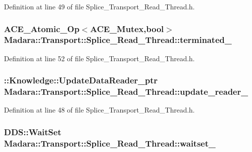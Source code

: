Definition at line 49 of file Splice\_\-Transport\_\-Read\_\-Thread.h.

\hypertarget{classMadara_1_1Transport_1_1Splice__Read__Thread_a5cafe35dd52b080cce126ee746c79033}{
\subsubsection[{terminated\_\-}]{\setlength{\rightskip}{0pt plus 5cm}ACE\_\-Atomic\_\-Op$<$ACE\_\-Mutex,bool$>$ {\bf Madara::Transport::Splice\_\-Read\_\-Thread::terminated\_\-}}}
\label{de/db7/classMadara_1_1Transport_1_1Splice__Read__Thread_a5cafe35dd52b080cce126ee746c79033}


Definition at line 52 of file Splice\_\-Transport\_\-Read\_\-Thread.h.

\hypertarget{classMadara_1_1Transport_1_1Splice__Read__Thread_a46dffcab5a39bda92f4783705bb893bd}{
\subsubsection[{update\_\-reader\_\-}]{\setlength{\rightskip}{0pt plus 5cm}::{\bf Knowledge::UpdateDataReader\_\-ptr} {\bf Madara::Transport::Splice\_\-Read\_\-Thread::update\_\-reader\_\-}}}
\label{de/db7/classMadara_1_1Transport_1_1Splice__Read__Thread_a46dffcab5a39bda92f4783705bb893bd}


Definition at line 48 of file Splice\_\-Transport\_\-Read\_\-Thread.h.

\hypertarget{classMadara_1_1Transport_1_1Splice__Read__Thread_a768b5b0cfa08c3e499a9d5075052457d}{
\subsubsection[{waitset\_\-}]{\setlength{\rightskip}{0pt plus 5cm}DDS::WaitSet {\bf Madara::Transport::Splice\_\-Read\_\-Thread::waitset\_\-}}}
\label{de/db7/classMadara_1_1Transport_1_1Splice__Read__Thread_a768b5b0cfa08c3e499a9d5075052457d}


